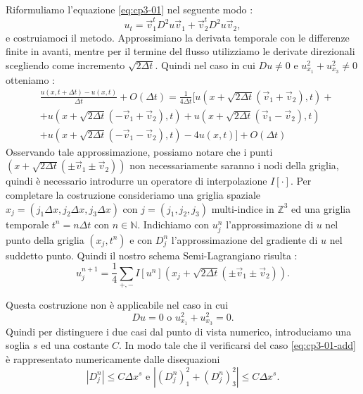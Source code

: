 Riformuliamo l'equazione \eqref{eq:cp3-01} nel seguente modo :
\begin{equation}
u_t=\vec{v}_1^tD^2u\vec{v}_1 + \vec{v}_2^tD^2u\vec{v}_2,
\end{equation}
e costruiamoci il metodo.
Approssimiano la derivata temporale con le differenze finite in avanti, mentre per il termine del flusso utilizziamo le derivate direzionali scegliendo come incremento $\sqrt{2\Delta t}$.
Quindi nel caso in cui $Du \ne 0$ e $u_{x_1}^2+u_{x_3}^2\ne 0$ otteniamo :
\[
\begin{split}
&\frac{u(x,t+\Delta t)-u(x,t)}{\Delta t} +O(\Delta t)= \frac{1}{4\Delta t}\bigl[u(x+\sqrt{2\Delta t}(\vec{v}_1+\vec{v}_2),t) +\\
& +u(x+\sqrt{2\Delta t}(-\vec{v}_1+\vec{v}_2),t) + u(x+\sqrt{2\Delta t}(\vec{v}_1-\vec{v}_2),t) \\
& + u(x+\sqrt{2\Delta t}(-\vec{v}_1-\vec{v}_2),t) - 4u(x,t)\bigr] + O(\Delta t)
\end{split}
\]
Osservando tale approssimazione, possiamo notare che i punti $(x + \sqrt{2\Delta t}(\pm\vec{v}_1 \pm\vec{v}_2))$ non necessariamente saranno i nodi della griglia, quindi è necessario introdurre un operatore di interpolazione $I[\cdot]$.
Per completare la costruzione consideriamo una griglia spaziale $x_j=(j_1\Delta x,j_2\Delta x,j_3\Delta x)$ con $j=(j_1,j_2,j_3)$ multi-indice in $\mathbb{Z}^3$ ed una griglia temporale $t^n=n\Delta t$ con $n\in\mathbb{N}$.
Indichiamo con $u_j^n$ l'approssimazione di $u$ nel punto della griglia $(x_j,t^n)$ e con $D_j^n$ l'approssimazione del gradiente di $u$ nel suddetto punto. Quindi il nostro schema Semi-Lagrangiano risulta :
\begin{equation}
\label{eq:cp3-02}
u_j^{n+1} = \frac{1}{4}\sum_{+,-}I[u^n](x_j+\sqrt{2\Delta t}(\pm\vec{v}_1\pm\vec{v}_2)).
\end{equation} 
\begin{osservazione}
Questa costruzione non è applicabile nel caso in cui 
\begin{equation}
\label{eq:cp3-01-add}
Du = 0 \text{ o } u_{x_1}^2+u_{x_3}^2 = 0. 
\end{equation}
Quindi per distinguere i due casi dal punto di vista numerico, introduciamo una soglia $s$ ed una costante $C$. In modo tale che il verificarsi del caso \eqref{eq:cp3-01-add} è rappresentato numericamente dalle disequazioni
\begin{equation}
\label{eq:cp3-sc3-1-01}
|D_j^n|\le C\Delta x^s\text{ e }|(D_j^n)_1^2+(D_j^n)_3^2|\le C\Delta x^s.
\end{equation}
\end{osservazione}
